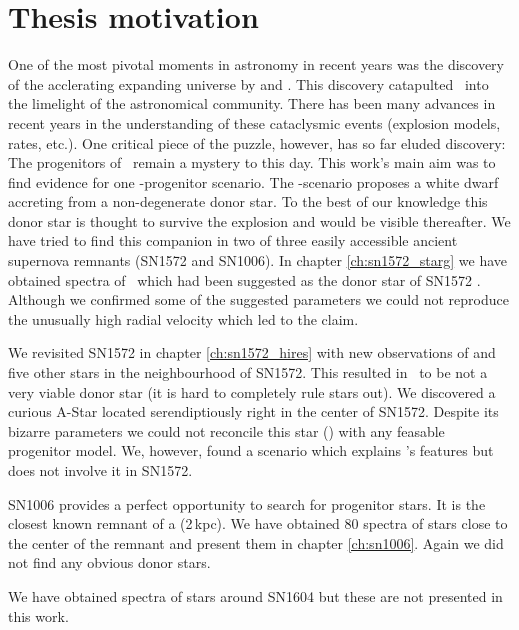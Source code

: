 \section{Thesis motivation}
One of the most pivotal moments in astronomy in recent years was the discovery of the acclerating expanding universe by \citet{1998AJ....116.1009R} and \citet{1999ApJ...517..565P}. This discovery catapulted \sneia\ into the limelight of the astronomical community. There has been many advances in recent years in the understanding of these cataclysmic events (explosion models, rates, etc.). One critical piece of the puzzle, however, has so far eluded discovery: The progenitors of \sneia\ remain a mystery to this day. This work's main aim was to find evidence for one \snia-progenitor scenario. The \sd-scenario proposes a white dwarf accreting from a non-degenerate donor star. To the best of our knowledge this donor star is thought to survive the explosion and would be visible thereafter. We have tried to find this companion in two of three easily accessible ancient supernova remnants (SN1572 and SN1006). 
In chapter \ref{ch:sn1572_starg} we have obtained spectra of \starg\ which had been suggested as the donor star of SN1572 \citep{2004Natur.431.1069R}. Although we confirmed some of the suggested parameters we could not reproduce the unusually high radial velocity which led to the claim. 

We revisited SN1572 in chapter \ref{ch:sn1572_hires} with new observations of \starg and five other stars in the neighbourhood of SN1572. This resulted in \starg\ to be not a very viable donor star (it is hard to completely rule stars out). We discovered a curious A-Star located serendiptiously right in the center of SN1572. Despite its bizarre parameters we could not reconcile this star (\starb) with any feasable progenitor model. We, however, found a scenario which explains \starb's features but does not involve it in SN1572. 

SN1006 provides a perfect opportunity to search for progenitor stars. It is the closest known remnant of a \snia (2\,kpc). We have obtained 80 spectra of stars close to the center of the remnant and present them in chapter \ref{ch:sn1006}. Again we did not find any obvious donor stars. 

We have obtained spectra of stars around SN1604 but these are not presented in this work.

